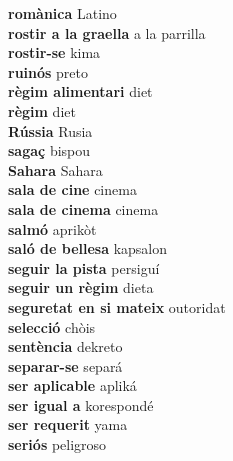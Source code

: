 \textbf{ romànica  } Latino \\
\textbf{ rostir a la graella  } a la parrilla \\
\textbf{ rostir-se  } kima \\
\textbf{ ruinós  } preto \\
\textbf{ règim alimentari  } diet \\
\textbf{ règim  } diet \\
\textbf{ Rússia  } Rusia \\
\textbf{ sagaç  } bispou \\
\textbf{ Sahara  } Sahara \\
\textbf{ sala de cine  } cinema \\
\textbf{ sala de cinema  } cinema \\
\textbf{ salmó  } aprikòt \\
\textbf{ saló de bellesa  } kapsalon \\
\textbf{ seguir la pista  } persiguí \\
\textbf{ seguir un règim  } dieta \\
\textbf{ seguretat en si mateix  } outoridat \\
\textbf{ selecció  } chòis \\
\textbf{ sentència  } dekreto \\
\textbf{ separar-se  } separá \\
\textbf{ ser aplicable  } apliká \\
\textbf{ ser igual a  } korespondé \\
\textbf{ ser requerit  } yama \\
\textbf{ seriós  } peligroso \\
